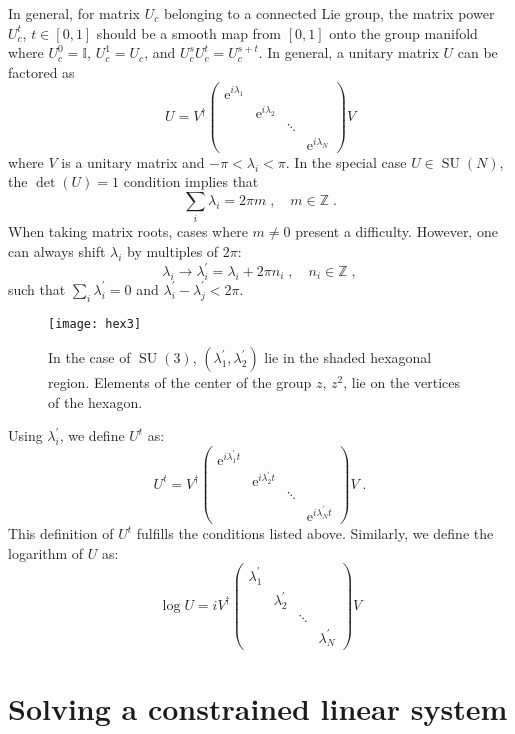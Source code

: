 \documentclass[preprint,aps,prd]{revtex4-2}
\newcommand{\da}{\dagger}  %
\newcommand{\be}{\begin{equation}}
\newcommand{\eq}{\end{equation}}
\newcommand{\integer}{\mathbb{Z}}       %
\DeclareMathOperator{\SU}{SU}
\begin{document}
{In general, for matrix $U_c$ belonging to a connected Lie group,
the matrix power $U_c^t$, $t\in[0,1]$ should be a
smooth map from $[0,1]$ onto the group manifold where
$U_c^0=\mathbb{I}$, $U_c^1=U_c$, and $U_c^s U_c^t = U_c^{s+t}$.
In general, a unitary matrix $U$ can be factored as
%
\be
U = V^\da \begin{pmatrix}
    \mathrm{e}^{i \lambda_1} & & &\\
    & \mathrm{e}^{i \lambda_2} & &\\
    & & \ddots & \\
    & & & \mathrm{e}^{i \lambda_N}\end{pmatrix} V
\eq
%
where $V$ is a unitary matrix and $-\pi < \lambda_i < \pi$.
In the special case $U \in \SU(N)$, the $\det(U)=1$ condition implies that
\be
\sum_i \lambda_i = 2 \pi m\;, \quad m\in\integer \;.
\eq
When taking matrix roots, cases where $m\neq 0$ present a
difficulty.  However, one can always shift $\lambda_i$ by
multiples of $2\pi$:
\be
\lambda_i \to \lambda_i^\prime = \lambda_i + 2 \pi n_i\;,\quad
n_i\in\integer \; ,
\eq
such that $\sum_i \lambda_i^\prime = 0$ and
$\lambda_i^\prime - \lambda_j^\prime < 2 \pi$.
%
\begin{figure}

\texttt{[image: hex3]}
  \caption{In the case of $\SU(3)$, $(\lambda_1^\prime,\lambda_2^\prime)$ lie in the shaded hexagonal region.
    Elements of the center of the group $z$, $z^2$, lie on the vertices of the hexagon.}
\end{figure}
%
Using $\lambda_i^\prime$, we define $U^t$ as:
\be
U^t = V^\da \begin{pmatrix}
    \mathrm{e}^{i\lambda_1^\prime t} & & &\\
    & \mathrm{e}^{i\lambda_2^\prime t} & &\\
    & & \ddots & \\
    & & & \mathrm{e}^{i\lambda_N^\prime t}\end{pmatrix} V \; .
\eq
This definition of $U^t$ fulfills the conditions listed above.
Similarly, we define the logarithm of $U$ as:
\be
\log U = i V^\da \begin{pmatrix}
    \lambda_1^\prime & & &\\
    & \lambda_2^\prime & &\\
    & & \ddots & \\
    & & & \lambda_N^\prime\end{pmatrix} V
\eq

\section{Solving a constrained linear system}
\label{krylov}

}
\end{document}
